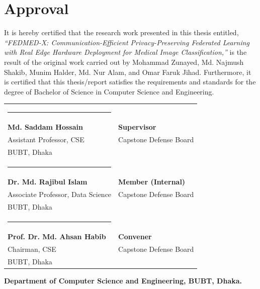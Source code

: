 \chapter*{Approval}

It is hereby certified that the research work presented in this thesis entitled,
\textit{``FEDMED-X: Communication-Efficient Privacy-Preserving Federated
Learning with Real Edge Hardware Deployment for Medical Image
Classification,''} is the result of the original work carried out by Mohammad
Zunayed, Md. Najmush Shakib, Munim Halder, Md. Nur Alam, and Omar Faruk
Jihad. Furthermore, it is certified that this thesis/report satisfies the
requirements and standards for the degree of Bachelor of Science in Computer
Science and Engineering.

\vspace{18pt}

\noindent
\begin{tabularx}{\textwidth}{@{}p{7.5cm}X@{}}
\rule{6cm}{0.4pt} & \\
\textbf{Md. Saddam Hossain}          & \textbf{Supervisor} \\
Assistant Professor, CSE             & Capstone Defense Board \\
BUBT, Dhaka                          &  \\[22pt]

\rule{6cm}{0.4pt} & \\
\textbf{Dr. Md. Rajibul Islam}       & \textbf{Member (Internal)} \\
Associate Professor, Data Science    & Capstone Defense Board \\
BUBT, Dhaka                          & \\[22pt]

\rule{6cm}{0.4pt} & \\
\textbf{Prof. Dr. Md. Ahsan Habib}   & \textbf{Convener} \\
Chairman, CSE                        & Capstone Defense Board \\
BUBT, Dhaka                          & \\
\end{tabularx}

\vspace{22pt}
\begin{center}
\textbf{Department of Computer Science and Engineering, BUBT, Dhaka.}
\end{center}